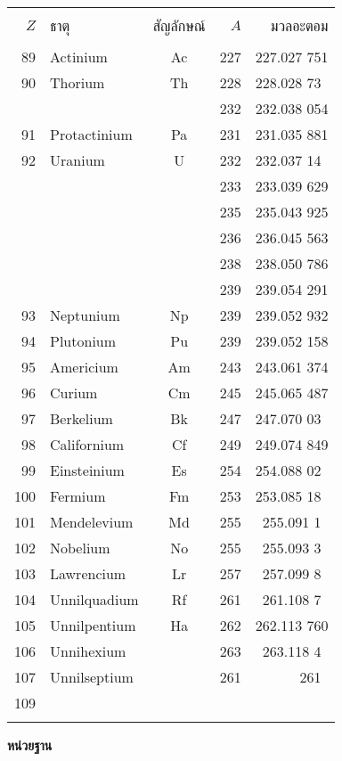 \begin{tabular}{rlcrr}
\hline\\
$Z$&ธาตุ&สัญลักษณ์&$A$&มวลอะตอม\\
\hline\\
89&Actinium&Ac&227&227.027 751\\
90&Thorium&Th&228&228.028 73\mbox{ }\\
&&&232&232.038 054\\
91&Protactinium&Pa&231&231.035 881\\
92&Uranium&U&232&232.037 14\mbox{ }\\
&&&233&233.039 629\\
&&&235&235.043 925\\
&&&236&236.045 563\\
&&&238&238.050 786\\
&&&239&239.054 291\\
93&Neptunium&Np&239&239.052 932\\
94&Plutonium&Pu&239&239.052 158\\
95&Americium&Am&243&243.061 374\\
96&Curium&Cm&245&245.065 487\\
97&Berkelium&Bk&247&247.070 03\mbox{ }\\
98&Californium&Cf&249&249.074 849\\
99&Einsteinium&Es&254&254.088 02\mbox{ }\\
100&Fermium&Fm&253&253.085 18\mbox{ }\\
101&Mendelevium&Md&255&255.091 1\mbox{  }\\
102&Nobelium&No&255&255.093 3\mbox{  }\\
103&Lawrencium&Lr&257&257.099 8\mbox{  }\\
104&Unnilquadium&Rf&261&261.108 7\mbox{  }\\
105&Unnilpentium&Ha&262&262.113 760\\
106&Unnihexium&&263&263.118 4\mbox{  }\\
107&Unnilseptium&&261&261\mbox{       }\\
109&&&&\\\\
\hline
\end{tabular}



\newpage
\renewcommand{\thesection}{ง}
\renewcommand{\theequation}{\thesection.\arabic{equation}}
 \setcounter{equation}{0}
\label{SecApp4}
\noindent \textbf{หน่วยฐาน}

